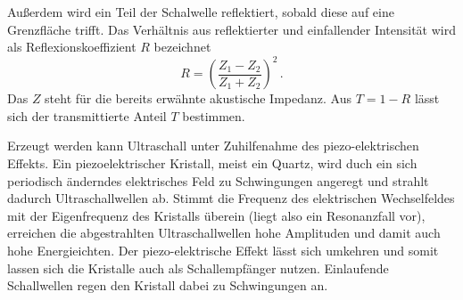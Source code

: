 Außerdem wird ein Teil der Schalwelle reflektiert, sobald diese auf eine Grenzfläche trifft.
Das Verhältnis aus reflektierter und einfallender Intensität wird als Reflexionskoeffizient
$R$ bezeichnet
\begin{equation}
  R = \left(\frac{Z_1 - Z_2}{Z_1 + Z_2} \right)^2 \, .
  \label{eqn:5}
\end{equation}
Das $Z$ steht für die bereits erwähnte akustische Impedanz. Aus $T = 1 - R$ lässt
sich der transmittierte Anteil $T$ bestimmen.

Erzeugt werden kann Ultraschall unter Zuhilfenahme des piezo-elektrischen Effekts.
Ein piezoelektrischer Kristall, meist ein Quartz, wird duch ein sich periodisch änderndes elektrisches Feld
zu Schwingungen angeregt und strahlt dadurch Ultraschallwellen ab. Stimmt die Frequenz des
elektrischen Wechselfeldes mit der Eigenfrequenz des Kristalls überein (liegt also ein
Resonanzfall vor),
erreichen die abgestrahlten Ultraschallwellen hohe Amplituden und damit auch hohe Energieichten.
Der piezo-elektrische Effekt lässt sich umkehren und somit lassen sich die
Kristalle auch als Schallempfänger nutzen. Einlaufende Schallwellen regen den Kristall dabei zu Schwingungen an.

